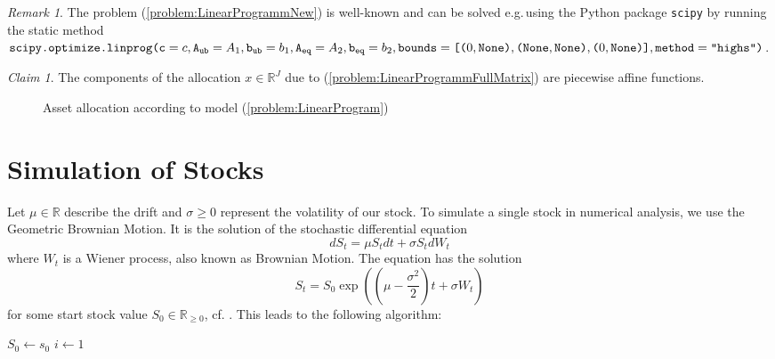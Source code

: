 \documentclass[a4paper, english, 11pt, onecolumn, oneside, final]{article}
\numberwithin{equation}{section}   %
\newcommand{\R}{\mathbb{R}}                 %
\theoremstyle{plain}
\theoremstyle{definition}
\theoremstyle{remark}
\newtheorem{remark}     [theorem]{Remark}
\newtheorem{claim}      [theorem]{Claim}
\begin{document}
\begin{remark}
    The problem (\ref{problem:LinearProgrammNew}) is well-known and can be solved e.g.\,using the Python package \texttt{scipy} by running the static method $\texttt{scipy.optimize.linprog(c}=c, \texttt{A}_\texttt{ub}=A_1, \texttt{b}_\texttt{ub}=b_1, \\ \texttt{A}_\texttt{eq}=A_2, \texttt{b}_\texttt{eq}=b_2, \texttt{bounds}=\texttt{[(}0,\texttt{None)},\texttt{(None},\texttt{None)},\texttt{(}0,\texttt{None)]}, \texttt{method}=\texttt{"highs")}$.
\end{remark}
\begin{claim}
    The components of the allocation $x\in\R^J$ due to (\ref{problem:LinearProgrammFullMatrix}) are piecewise affine functions.
\end{claim}
\begin{figure}[h]
  \centering
  
  \caption{Asset allocation according to model (\ref{problem:LinearProgram})}
\end{figure}\newpage
\section{Simulation of Stocks}\label{section:SimulationOfStocks}
Let $\mu\in\R$ describe the drift and $\sigma\geq0$ represent the volatility of our stock. To simulate a single stock in numerical analysis, we use the Geometric Brownian Motion. It is the solution of the stochastic differential equation
\begin{equation*}
    dS_t = \mu S_tdt + \sigma S_tdW_t
\end{equation*}
where $W_t$ is a Wiener process, also known as Brownian Motion. The equation has the solution
\begin{equation*}
    S_t = S_0\exp\left(\left(\mu-\frac{\sigma^2}{2}\right)t+\sigma W_t\right)
\end{equation*}
for some start stock value $S_0\in\R_{\geq0}$, cf. \citet[p.~113]{PichlerStochastischeFinanzmaerkte}. This leads to the following algorithm:
\begin{algorithm}
    \caption{Geometric Brownian Motion}
    \label{algo:GBM}
    \KwData{$s_0\in\R_{\geq0}, \mu\in\R, \sigma\geq0$}
    $S_0 \gets s_0$\;
    $i \gets 1$\;
    \KwResult{$S\in\R_{\geq0}^n$}
\end{algorithm}
\end{document}
